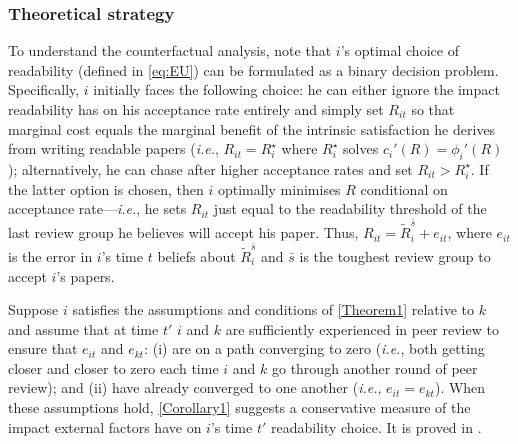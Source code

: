 \subsubsection{Theoretical strategy}
\label{matchingtheory}

To understand the counterfactual analysis, note that $i$'s optimal choice of readability (defined in \autoref{eq:EU}) can be formulated as a binary decision problem. Specifically, $i$ initially faces the following choice: he can either ignore the impact readability has on his acceptance rate entirely and simply set $R_{it}$ so that marginal cost equals the marginal benefit of the intrinsic satisfaction he derives from writing readable papers (\emph{i.e.}, $R_{it}=R_i^\star$ where $R_i^\star$ solves $c_i'(R)=\phi_i'(R)$); alternatively, he can chase after higher acceptance rates and set $R_{it}>R_i^\star$. If the latter option is chosen, then $i$ optimally minimises $R$ conditional on acceptance rate---\emph{i.e.}, he sets $R_{it}$ just equal to the readability threshold of the last review group he believes will accept his paper. Thus, $R_{it}=\widetilde R_i^{\bar s} + e_{it}$, where $e_{it}$ is the error in $i$'s time $t$ beliefs about $\widetilde R_i^{\bar s}$ and $\bar s$ is the toughest review group to accept $i$'s papers.

Suppose $i$ satisfies the assumptions and conditions of \autoref{Theorem1} relative to $k$ and assume that at time $t'$ $i$ and $k$ are sufficiently experienced in peer review to ensure that $e_{it}$ and $e_{kt}$: (i) are on a path converging to zero (\emph{i.e.}, both getting closer and closer to zero each time $i$ and $k$ go through another round of peer review); and (ii) have already converged to one another (\emph{i.e.}, $e_{it}=e_{kt}$). When these assumptions hold, \autoref{Corollary1} suggests a conservative measure of the impact external factors have on $i$'s time $t'$ readability choice. It is proved in .



